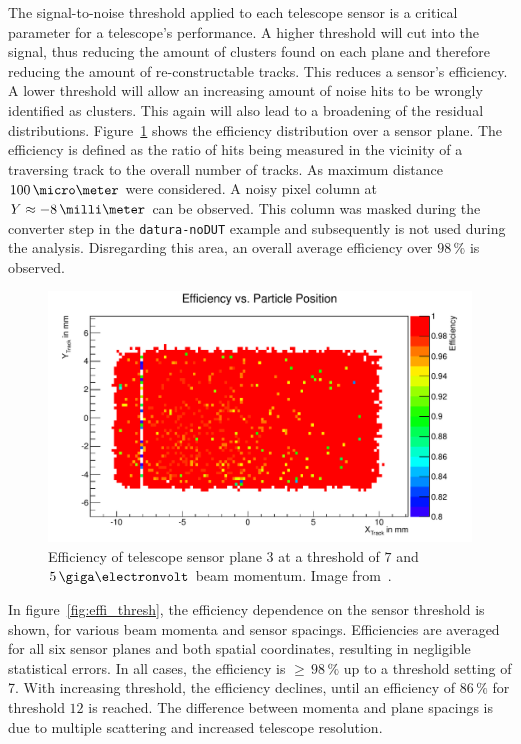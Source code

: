 The signal-to-noise threshold applied to each telescope sensor is a critical parameter for a telescope's performance.
A higher threshold will cut into the signal, thus reducing the amount of clusters found on each plane and therefore reducing the amount of re-constructable tracks.
This reduces a sensor's efficiency.
A lower threshold will allow an increasing amount of noise hits to be wrongly identified as clusters.
This again will also lead to a broadening of the residual distributions.
Figure~\ref{fig:effi} shows the efficiency distribution over a sensor plane.
The efficiency is defined as the ratio of hits being measured in the vicinity of a traversing track to the overall number of tracks.
As maximum distance $100\,\micro\meter$ were considered.
A noisy pixel column at $Y \approx -8\,\milli\meter$ can be observed.
This column was masked during the converter step in the \texttt{datura-noDUT} example and subsequently is not used during the analysis.
Disregarding this area, an overall average efficiency over $98\,\%$ is observed.

\begin{figure}[tbp]
  \centering
  \includegraphics[width=\textwidth]{figures/plane3_effi_run37.pdf}
  \caption[Telescope sensor efficiency~\cite{ref:thomas}]{Efficiency of telescope sensor plane $3$ at a threshold of $7$ and $5\,\giga\electronvolt$ beam momentum.
Image from~\cite{ref:thomas}.}
\label{fig:effi}
\end{figure}

In figure~\ref{fig:effi_thresh}, the efficiency dependence on the sensor threshold is shown, for various beam momenta and sensor spacings.
Efficiencies are averaged for all six sensor planes and both spatial coordinates, resulting in negligible statistical errors. 
In all cases, the efficiency is $\ge\,98\,\%$ up to a threshold setting of 7.
With increasing threshold, the efficiency declines, until an efficiency of $86\,\%$ for threshold $12$ is reached.
The difference between momenta and plane spacings is due to multiple scattering and increased telescope resolution.

